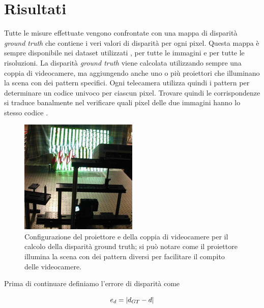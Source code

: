 \documentclass[12pt]{report}
\newcommand{\nullpage}{\newpage\null\thispagestyle{empty}}  %
\DeclarePairedDelimiter{\abs}{\lvert}{\rvert}    %
\begin{document}
				\nullpage

	\chapter{Risultati}
	\label{sec:risultati}
	\pagestyle{fancy}				
	
		Tutte le misure effettuate vengono confrontate con una mappa di disparità \textit{ground truth} che contiene i veri valori di disparità per ogni pixel. Questa mappa è sempre disponibile nei dataset utilizzati \cite{dataset_2006_1, dataset_2006_2}, per tutte le immagini e per tutte le risoluzioni. La disparità \textit{ground truth} viene calcolata utilizzando sempre una coppia di videocamere, ma aggiungendo anche uno o più proiettori che illuminano la scena con dei pattern specifici. Ogni telecamera utilizza quindi i pattern per determinare un codice univoco per ciascun pixel. Trovare quindi le corrispondenze si traduce banalmente nel verificare quali pixel delle due immagini hanno lo stesso codice \cite{ground_truth}.  			
		
		\begin{figure}
			\includegraphics[width=0.5\textwidth]{./figures/ground_truth.png}
			\caption{Configurazione del proiettore e della coppia di videocamere per il calcolo della disparità ground truth; si può notare come il proiettore illumina la scena con dei pattern diversi per facilitare il compito delle videocamere.}
			\label{fig:groundtruth}
		\end{figure}
		
		\noindent Prima di continuare definiamo l'errore di disparità come
		
		\begin{equation}
			e_{d}=\abs{d_{GT}-d}
			\label{eq:errore}
		\end{equation} 
		
\end{document}
